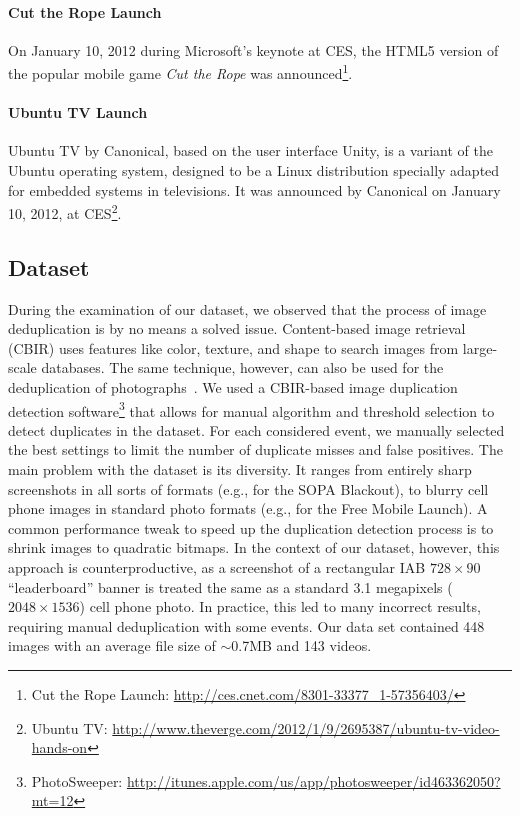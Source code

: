 \documentclass{acm_proc_article-sp}
\newcommand{\inlinelistingsize}{\fontsize{8pt}{11pt}}
\let\oldurl\url
\renewcommand{\url}[1]{\inlinelistingsize\oldurl{#1}}
\begin{document}
\paragraph{Cut the Rope Launch}
On January 10, 2012 during Microsoft's keynote at CES, the HTML5 version of the popular mobile game \textit{Cut the Rope} was announced\footnote{Cut the Rope Launch: \url{http://ces.cnet.com/8301-33377_1-57356403/}}.

\paragraph{Ubuntu TV Launch}
Ubuntu TV by Canonical, based on the user interface Unity, is a variant of the Ubuntu operating system, designed to be a Linux distribution specially adapted for embedded systems in televisions. It was announced by Canonical on January 10, 2012, at CES\footnote{Ubuntu TV: \url{http://www.theverge.com/2012/1/9/2695387/ubuntu-tv-video-hands-on}}.

\subsection{Dataset}
\label{subsec:dataset}
During the examination of our dataset, we observed that the process of image deduplication is by no means a solved issue.
Content-based image retrieval (CBIR) uses features like color, texture, and shape to search images from large-scale databases.
The same technique, however, can also be used for the deduplication of photographs~\cite{Pattabhi2011}.
We used a CBIR-based image duplication detection software\footnote{PhotoSweeper: \url{http://itunes.apple.com/us/app/photosweeper/id463362050?mt=12}} that allows for manual algorithm and threshold selection to detect duplicates in the dataset.
For each considered event, we manually selected the best settings to limit the number of duplicate misses and false positives.
The main problem with the dataset is its diversity.
It ranges from entirely sharp screenshots in all sorts of formats (e.g., for the SOPA Blackout), to blurry cell phone images in standard photo formats (e.g., for the Free Mobile Launch).
A common performance tweak to speed up the duplication detection process is to shrink images to quadratic bitmaps.
In the context of our dataset, however, this approach is counterproductive, as a screenshot of a rectangular IAB $728 \times 90$ ``leaderboard'' banner is treated the same as a standard 3.1 megapixels ($2048 \times 1536$) cell phone photo.
In practice, this led to many incorrect results, requiring manual deduplication with some events.
Our data set contained 448 images with an average file size of $\sim$0.7MB and 143 videos.
\end{document}
